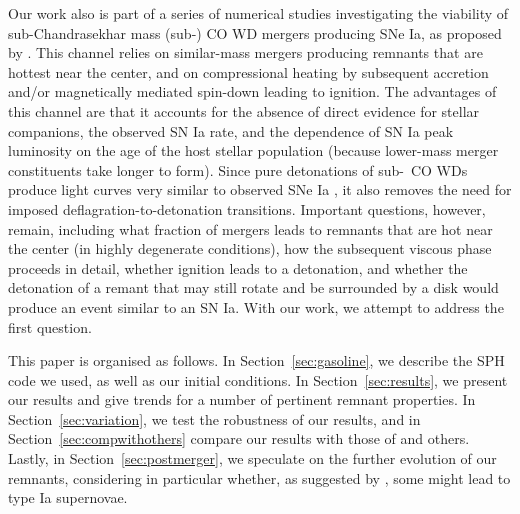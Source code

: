 Our work also is part of a series of numerical studies investigating the viability of sub-Chandrasekhar mass (sub-\Mch) CO WD mergers producing SNe Ia, as proposed by \citeal{vkercj10}.  This channel relies on similar-mass mergers producing remnants that are hottest near the center, and on compressional heating by subsequent accretion and/or magnetically mediated spin-down leading to ignition.  The advantages of this channel are that it accounts for the absence of direct evidence for stellar companions, the observed SN Ia rate, and the dependence of SN Ia peak luminosity on the age of the host stellar population (because lower-mass merger constituents take longer to form).  Since pure detonations of sub-\Mch\ CO WDs produce light curves very similar to observed SNe Ia \citep{shig+92,sim+10}, it also removes the need for imposed deflagration-to-detonation transitions.  Important questions, however, remain, including what fraction of mergers leads to remnants that are hot near the center (in highly degenerate conditions), how the subsequent viscous phase proceeds in detail, whether ignition leads to a detonation, and whether the detonation of a remant that may still rotate and be surrounded by a disk would produce an event similar to an SN Ia.  With our work, we attempt to address the first question.

This paper is organised as follows.  In Section~\ref{sec:gasoline}, we describe the SPH code we used, as well as our initial conditions.  In Section~\ref{sec:results}, we present our results and give trends for a number of pertinent remnant properties.  In Section~\ref{sec:variation}, we test the robustness of our results, and in Section~\ref{sec:compwithothers} compare our results with those of \citeal{loreig09} and others.  Lastly, in Section~\ref{sec:postmerger}, we speculate on the further evolution of our remnants, considering in particular whether, as suggested by \citeal{vkercj10}, some might lead to type Ia supernovae.


